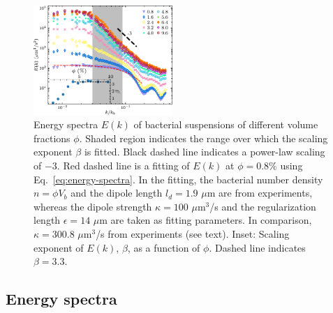 \documentclass[twocolumn,aps,prx,amsmath,amssymb,longbibliography]{revtex4-2}
\begin{document}
\begin{figure}[t]
\begin{center}\includegraphics[width=0.47\textwidth]{Figures/energy-spectra/v6.pdf}
\caption[Concentration dependence of energy spectra.]
{
Energy spectra $E(k)$ of bacterial suspensions of different volume fractions $\phi$. Shaded region indicates the range over which the scaling exponent $\beta$ is fitted. Black dashed line indicates a power-law scaling of $-3$. Red dashed line is a fitting of $E(k)$ at $\phi=0.8\%$ using Eq.~\ref{eq:energy-spectra}. In the fitting, the bacterial number density $n=\phi V_b$ and the dipole length $l_d = 1.9$ $\mu$m are from experiments, whereas the dipole strength $\kappa = 100$ $\mu$m$^3$/s and the regularization length $\epsilon = 14$ $\mu$m are taken as fitting parameters. In comparison, $\kappa = 300.8$ $\mu$m$^3$/s from experiments (see text).
Inset: Scaling exponent of $E(k)$, $\beta$, as a function of $\phi$. Dashed line indicates $\beta = 3.3$.
}
\label{fig:energy-spectra}
\end{center}
\end{figure}

\subsection{Energy spectra}
\end{document}
